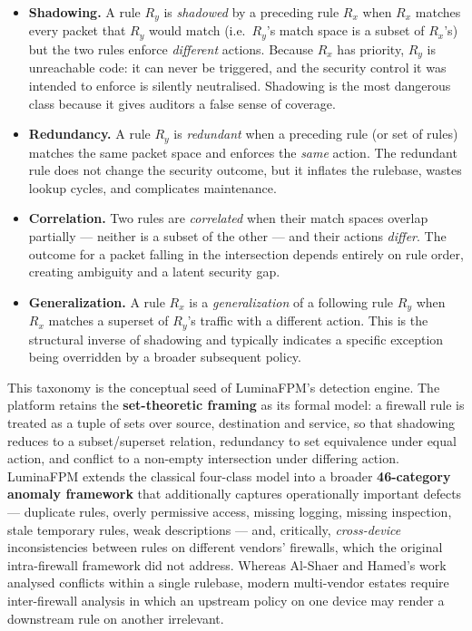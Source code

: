 \documentclass[12pt,a4paper]{report}
\renewcommand{\_}{\textunderscore\allowbreak}
\begin{document}
\begin{itemize}[leftmargin=2em]
  \item \textbf{Shadowing.} A rule $R_y$ is \emph{shadowed} by a preceding rule $R_x$ when $R_x$ matches every packet that $R_y$ would match (i.e.\ $R_y$'s match space is a subset of $R_x$'s) but the two rules enforce \emph{different} actions. Because $R_x$ has priority, $R_y$ is unreachable code: it can never be triggered, and the security control it was intended to enforce is silently neutralised. Shadowing is the most dangerous class because it gives auditors a false sense of coverage.
  \item \textbf{Redundancy.} A rule $R_y$ is \emph{redundant} when a preceding rule (or set of rules) matches the same packet space and enforces the \emph{same} action. The redundant rule does not change the security outcome, but it inflates the rulebase, wastes lookup cycles, and complicates maintenance.
  \item \textbf{Correlation.} Two rules are \emph{correlated} when their match spaces overlap partially --- neither is a subset of the other --- and their actions \emph{differ}. The outcome for a packet falling in the intersection depends entirely on rule order, creating ambiguity and a latent security gap.
  \item \textbf{Generalization.} A rule $R_x$ is a \emph{generalization} of a following rule $R_y$ when $R_x$ matches a superset of $R_y$'s traffic with a different action. This is the structural inverse of shadowing and typically indicates a specific exception being overridden by a broader subsequent policy.
\end{itemize}

This taxonomy is the conceptual seed of LuminaFPM's detection engine. The platform retains the \textbf{set-theoretic framing} as its formal model: a firewall rule is treated as a tuple of sets over source, destination and service, so that shadowing reduces to a subset/superset relation, redundancy to set equivalence under equal action, and conflict to a non-empty intersection under differing action. LuminaFPM extends the classical four-class model into a broader \textbf{46-category anomaly framework} that additionally captures operationally important defects --- duplicate rules, overly permissive access, missing logging, missing inspection, stale temporary rules, weak descriptions --- and, critically, \emph{cross-device} inconsistencies between rules on different vendors' firewalls, which the original intra-firewall framework did not address. Whereas Al-Shaer and Hamed's work analysed conflicts within a single rulebase, modern multi-vendor estates require inter-firewall analysis in which an upstream policy on one device may render a downstream rule on another irrelevant.
\end{document}
